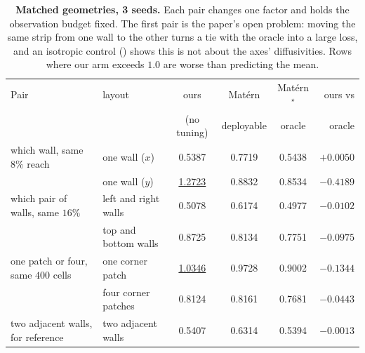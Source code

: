 \begin{table}[t]
  \centering
  \caption{\textbf{Matched geometries, 3 seeds.}  Each pair changes one factor and holds the observation budget fixed.  The first pair is the paper's open problem: moving the same strip from one wall to the other turns a tie with the oracle into a large loss, and an isotropic control () shows this is not about the axes' diffusivities.  Rows where our arm exceeds $1.0$ are worse than predicting the mean.}
  \label{tab:geometry}
  \small
  \begin{tabular}{llcccr}
    \toprule
    Pair & layout & ours & Mat\'ern & Mat\'ern$^\star$ & ours vs \\
    & & (no tuning) & deployable & oracle & oracle \\
    \midrule
    which wall, same $8\%$ reach & one wall ($x$) & 0.5387 & 0.7719 & 0.5438 & $+0.0050$ \\
     & one wall ($y$) & \underline{1.2723} & 0.8832 & 0.8534 & $-0.4189$ \\
    \addlinespace
    which pair of walls, same $16\%$ & left and right walls & 0.5078 & 0.6174 & 0.4977 & $-0.0102$ \\
     & top and bottom walls & 0.8725 & 0.8134 & 0.7751 & $-0.0975$ \\
    \addlinespace
    one patch or four, same $400$ cells & one corner patch & \underline{1.0346} & 0.9728 & 0.9002 & $-0.1344$ \\
     & four corner patches & 0.8124 & 0.8161 & 0.7681 & $-0.0443$ \\
    \addlinespace
    two adjacent walls, for reference & two adjacent walls & 0.5407 & 0.6314 & 0.5394 & $-0.0013$ \\
    \bottomrule
  \end{tabular}
\end{table}

